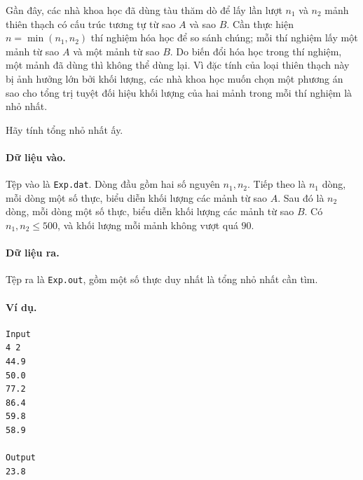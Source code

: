 \documentclass[11pt]{article}
\begin{document}
Gần đây, các nhà khoa học đã dùng tàu thăm dò để lấy lần lượt $n_1$ và $n_2$
mảnh thiên thạch có cấu trúc tương tự từ sao $A$ và sao $B$. Cần thực hiện
$n=\min(n_1,n_2)$ thí nghiệm hóa học để so sánh chúng; mỗi thí nghiệm lấy một
mảnh từ sao $A$ và một mảnh từ sao $B$. Do biến đổi hóa học trong thí nghiệm,
một mảnh đã dùng thì không thể dùng lại. Vì đặc tính của loại thiên thạch này
bị ảnh hưởng lớn bởi khối lượng, các nhà khoa học muốn chọn một phương án sao
cho tổng trị tuyệt đối hiệu khối lượng của hai mảnh trong mỗi thí nghiệm là
nhỏ nhất.

Hãy tính tổng nhỏ nhất ấy.

\paragraph{Dữ liệu vào.}
Tệp vào là \texttt{Exp.dat}. Dòng đầu gồm hai số nguyên $n_1,n_2$. Tiếp theo
là $n_1$ dòng, mỗi dòng một số thực, biểu diễn khối lượng các mảnh từ sao
$A$. Sau đó là $n_2$ dòng, mỗi dòng một số thực, biểu diễn khối lượng các
mảnh từ sao $B$. Có $n_1,n_2\le 500$, và khối lượng mỗi mảnh không vượt quá
$90$.

\paragraph{Dữ liệu ra.}
Tệp ra là \texttt{Exp.out}, gồm một số thực duy nhất là tổng nhỏ nhất cần tìm.

\paragraph{Ví dụ.}
\begin{verbatim}
Input
4 2
44.9
50.0
77.2
86.4
59.8
58.9

Output
23.8
\end{verbatim}
\end{document}
